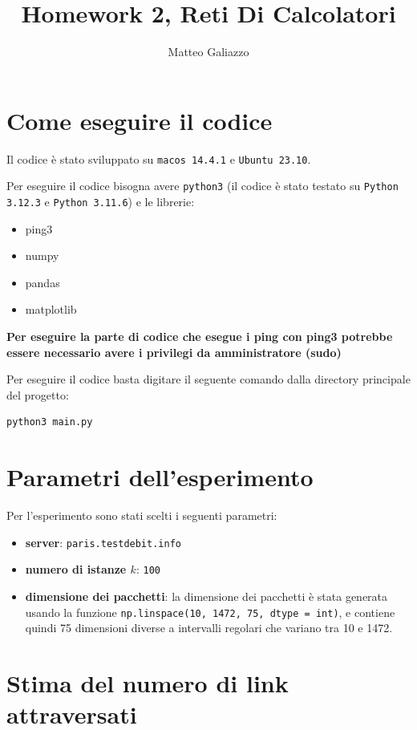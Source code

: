 \documentclass{article}
\title{Homework 2, Reti Di Calcolatori}
\author{Matteo Galiazzo}
\begin{document}
\maketitle

\tableofcontents

\section{Come eseguire il codice}

Il codice è stato sviluppato su \verb|macos 14.4.1| e \verb|Ubuntu 23.10|.

Per eseguire il codice bisogna avere \verb|python3| (il codice è stato testato su \verb|Python 3.12.3| e \verb|Python 3.11.6|) e le librerie:
\begin{itemize}
  \item ping3
  \item numpy
  \item pandas
  \item matplotlib
\end{itemize}

\textbf{Per eseguire la parte di codice che esegue i ping con ping3 potrebbe essere necessario avere i privilegi da amministratore (sudo)}

Per eseguire il codice basta digitare il seguente comando dalla directory principale del progetto:

\begin{lstlisting}
python3 main.py
\end{lstlisting}

\section{Parametri dell'esperimento}

Per l'esperimento sono stati scelti i seguenti parametri:
\begin{itemize}
  \item \textbf{server}: \verb|paris.testdebit.info|
  \item \textbf{numero di istanze $k$}: \verb|100|
  \item \textbf{dimensione dei pacchetti}: la dimensione dei pacchetti è stata generata usando la funzione \verb|np.linspace(10, 1472, 75, dtype = int)|, e contiene quindi 75 dimensioni diverse a intervalli regolari che variano tra 10 e 1472.
\end{itemize}

\section{Stima del numero di link attraversati}
\end{document}
